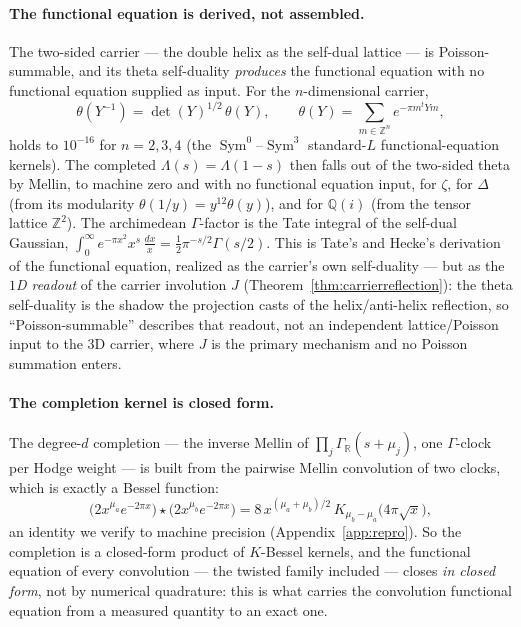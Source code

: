 \documentclass[11pt]{article}
\theoremstyle{definition}
\newcommand{\Sym}{\operatorname{Sym}}
\begin{document}
\paragraph{The functional equation is derived, not assembled.} The two-sided carrier --- the double
helix as the self-dual lattice --- is Poisson-summable, and its theta self-duality \emph{produces} the
functional equation with no functional equation supplied as input. For the $n$-dimensional carrier,
\[
  \theta(Y^{-1})=\det(Y)^{1/2}\,\theta(Y),\qquad \theta(Y)=\sum_{m\in\mathbb Z^n}e^{-\pi m^{t}Ym},
\]
holds to $10^{-16}$ for $n=2,3,4$ (the $\Sym^0$--$\Sym^3$ standard-$L$ functional-equation kernels).
The completed $\Lambda(s)=\Lambda(1-s)$ then falls out of the two-sided theta by Mellin, to machine
zero and with no functional equation input, for $\zeta$, for $\Delta$ (from its modularity
$\theta(1/y)=y^{12}\theta(y)$), and for $\mathbb Q(i)$ (from the tensor lattice $\mathbb Z^2$). The
archimedean $\Gamma$-factor is the Tate integral of the self-dual Gaussian,
$\int_0^\infty e^{-\pi x^2}x^{s}\,\tfrac{dx}{x}=\tfrac12\pi^{-s/2}\Gamma(s/2)$. This is Tate's and
Hecke's derivation of the functional equation, realized as the carrier's own self-duality --- but as the
\emph{$1$D readout} of the carrier involution $J$ (Theorem~\ref{thm:carrierreflection}): the theta self-duality
is the shadow the projection casts of the helix/anti-helix reflection, so ``Poisson-summable'' describes that
readout, not an independent lattice/Poisson input to the $3$D carrier, where $J$ is the primary mechanism and no
Poisson summation enters.

\paragraph{The completion kernel is closed form.} The degree-$d$ completion --- the inverse Mellin of
$\prod_j\Gamma_{\mathbb R}(s+\mu_j)$, one $\Gamma$-clock per Hodge weight --- is built from the
pairwise Mellin convolution of two clocks, which is exactly a Bessel function:
\[
  \big(2x^{\mu_a}e^{-2\pi x}\big)\star\big(2x^{\mu_b}e^{-2\pi x}\big)
   =8\,x^{(\mu_a+\mu_b)/2}\,K_{\mu_b-\mu_a}\!\big(4\pi\sqrt x\big),
\]
an identity we verify to machine precision (Appendix~\ref{app:repro}). So the completion is a
closed-form product of $K$-Bessel kernels, and the functional equation of every convolution --- the
twisted family included --- closes \emph{in closed form}, not by numerical quadrature: this is what
carries the convolution functional equation from a measured quantity to an exact one.
\end{document}
